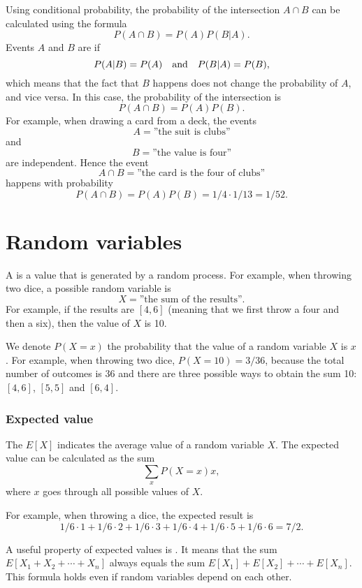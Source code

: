 
Using conditional probability,
the probability of the intersection
$A \cap B$ can be calculated using the formula
\[P(A \cap B)=P(A)P(B|A).\]
Events $A$ and $B$ are  if
\[P(A|B)=P(A) \hspace{10px}\textrm{and}\hspace{10px} P(B|A)=P(B),\]
which means that the fact that $B$ happens does not
change the probability of $A$, and vice versa.
In this case, the probability of the intersection is
\[P(A \cap B)=P(A)P(B).\]
For example, when drawing a card from a deck, the events
\[A = \textrm{''the suit is clubs''}\]
and
\[B = \textrm{''the value is four''}\]
are independent. Hence the event
\[A \cap B = \textrm{''the card is the four of clubs''}\]
happens with probability
\[P(A \cap B)=P(A)P(B)=1/4 \cdot 1/13 = 1/52.\]

\section{Random variables}


A  is a value that is generated
by a random process.
For example, when throwing two dice,
a possible random variable is
\[X=\textrm{''the sum of the results''}.\]
For example, if the results are $[4,6]$
(meaning that we first throw a four and then a six),
then the value of $X$ is 10.

We denote $P(X=x)$ the probability that
the value of a random variable $X$ is $x$.
For example, when throwing two dice,
$P(X=10)=3/36$,
because the total number of outcomes is 36
and there are three possible ways to obtain
the sum 10: $[4,6]$, $[5,5]$ and $[6,4]$.

\subsubsection{Expected value}


The  $E[X]$ indicates the
average value of a random variable $X$.
The expected value can be calculated as the sum
\[\sum_x P(X=x)x,\]
where $x$ goes through all possible values of $X$.

For example, when throwing a dice,
the expected result is
\[1/6 \cdot 1 + 1/6 \cdot 2 + 1/6 \cdot 3 + 1/6 \cdot 4 + 1/6 \cdot 5 + 1/6 \cdot 6 = 7/2.\]

A useful property of expected values is .
It means that the sum
$E[X_1+X_2+\cdots+X_n]$
always equals the sum
$E[X_1]+E[X_2]+\cdots+E[X_n]$.
This formula holds even if random variables
depend on each other.


